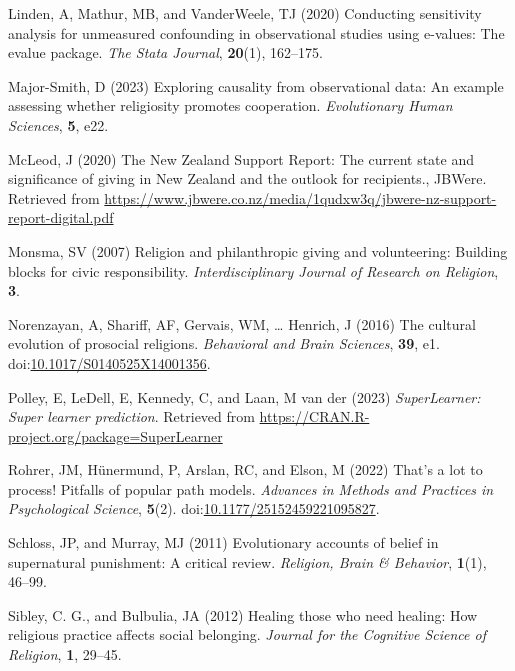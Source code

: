\documentclass[
  single column]{article}
\newlength{\cslhangindent}
\newenvironment{CSLReferences}[2] %
 {\begin{list}{}{%
  \setlength{\itemindent}{0pt}
  \setlength{\leftmargin}{0pt}
  \setlength{\parsep}{0pt}
  \ifodd #1
   \setlength{\leftmargin}{\cslhangindent}
   \setlength{\itemindent}{-1\cslhangindent}
  \fi
  \setlength{\itemsep}{#2\baselineskip}}}
 {\end{list}}
\begin{document}
\begin{CSLReferences}{1}{0}
Linden, A, Mathur, MB, and VanderWeele, TJ (2020) Conducting sensitivity
analysis for unmeasured confounding in observational studies using
e-values: The evalue package. \emph{The Stata Journal}, \textbf{20}(1),
162--175.

Major-Smith, D (2023) Exploring causality from observational data: An
example assessing whether religiosity promotes cooperation.
\emph{Evolutionary Human Sciences}, \textbf{5}, e22.

McLeod, J (2020) The {N}ew {Z}ealand {S}upport {R}eport: The current
state and significance of giving in {N}ew {Z}ealand and the outlook for
recipients., JBWere. Retrieved from
\url{https://www.jbwere.co.nz/media/1qudxw3q/jbwere-nz-support-report-digital.pdf}

Monsma, SV (2007) Religion and philanthropic giving and volunteering:
Building blocks for civic responsibility. \emph{Interdisciplinary
Journal of Research on Religion}, \textbf{3}.

Norenzayan, A, Shariff, AF, Gervais, WM, \ldots{} Henrich, J (2016) The
cultural evolution of prosocial religions. \emph{Behavioral and Brain
Sciences}, \textbf{39}, e1.
doi:\href{https://doi.org/10.1017/S0140525X14001356}{10.1017/S0140525X14001356}.

Polley, E, LeDell, E, Kennedy, C, and Laan, M van der (2023)
\emph{SuperLearner: Super learner prediction}. Retrieved from
\url{https://CRAN.R-project.org/package=SuperLearner}

Rohrer, JM, Hünermund, P, Arslan, RC, and Elson, M (2022) That's a lot
to process! Pitfalls of popular path models. \emph{Advances in Methods
and Practices in Psychological Science}, \textbf{5}(2).
doi:\href{https://doi.org/10.1177/25152459221095827}{10.1177/25152459221095827}.

Schloss, JP, and Murray, MJ (2011) Evolutionary accounts of belief in
supernatural punishment: A critical review. \emph{Religion, Brain \&
Behavior}, \textbf{1}(1), 46--99.

Sibley, C. G., and Bulbulia, JA (2012) Healing those who need healing:
How religious practice affects social belonging. \emph{Journal for the
Cognitive Science of Religion}, \textbf{1}, 29--45.


\end{CSLReferences}
\end{document}

